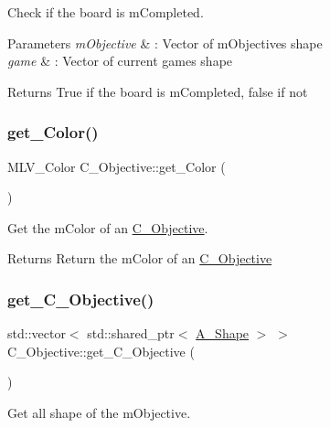 Check if the board is mCompleted.


\begin{DoxyParams}{Parameters}
{\em mObjective} & \+: Vector of mObjective\textquotesingle{}s shape \\
\hline
{\em game} & \+: Vector of current game\textquotesingle{}s shape \\
\hline
\end{DoxyParams}
\begin{DoxyReturn}{Returns}
True if the board is mCompleted, false if not
\end{DoxyReturn}
\mbox{\label{classObjective_ae20161454cf0dd248b8e17989044eb13}} 
\subsubsection{\texorpdfstring{get\+\_\+\+Color()}{get\_Color()}}
{\footnotesize\ttfamily M\+L\+V\+\_\+\+Color C_Objective\+::get\+\_\+\+Color (\begin{DoxyParamCaption}{ }\end{DoxyParamCaption})}



Get the mColor of an \hyperlink{classObjective}{C_Objective}.

\begin{DoxyReturn}{Returns}
Return the mColor of an \hyperlink{classObjective}{C_Objective}
\end{DoxyReturn}
\mbox{\label{classObjective_a9d379ffa32a62fbb5e5df62a88201baf}} 
\subsubsection{\texorpdfstring{get\+\_\+\+C_Objective()}{get\_Objective()}}
{\footnotesize\ttfamily std\+::vector$<$ std\+::shared\+\_\+ptr$<$ \hyperlink{classShape}{A_Shape} $>$ $>$ C_Objective\+::get\+\_\+\+C_Objective (\begin{DoxyParamCaption}{ }\end{DoxyParamCaption})}



Get all shape of the mObjective.

